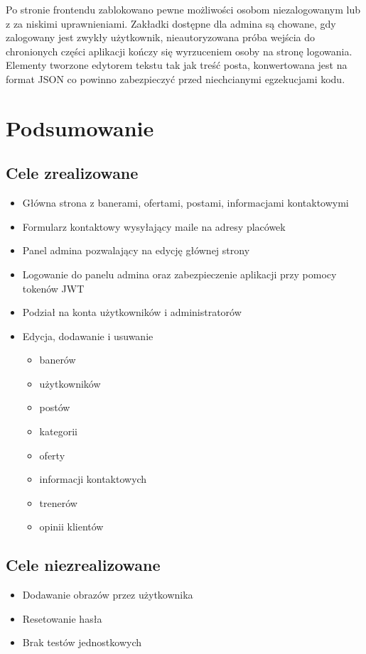 \documentclass[12pt]{article}
\begin{document}
Po stronie frontendu zablokowano pewne możliwości osobom niezalogowanym lub z za niskimi uprawnieniami. Zakładki dostępne dla admina są chowane, gdy zalogowany jest zwykły użytkownik, nieautoryzowana próba wejścia do chronionych części aplikacji kończy się wyrzuceniem osoby na stronę logowania.
\\

Elementy tworzone edytorem tekstu tak jak treść posta, konwertowana jest na format JSON co powinno zabezpieczyć przed niechcianymi egzekucjami kodu.
\section{Podsumowanie}
\subsection{Cele zrealizowane}
\begin{itemize}
\item Główna strona z banerami, ofertami, postami, informacjami kontaktowymi
\item Formularz kontaktowy wysyłający maile na adresy placówek
\item Panel admina pozwalający na edycję głównej strony
\item Logowanie do panelu admina oraz zabezpieczenie aplikacji przy pomocy tokenów JWT
\item Podział na konta użytkowników i administratorów
\item Edycja, dodawanie i usuwanie
\begin{itemize}
\item banerów
\item użytkowników
\item postów
\item kategorii
\item oferty
\item informacji kontaktowych
\item trenerów
\item opinii klientów
\end{itemize}
\end{itemize}
\subsection{Cele niezrealizowane}
\begin{itemize}
\item Dodawanie obrazów przez użytkownika
\item Resetowanie hasła
\item Brak testów jednostkowych
\end{itemize}
\end{document}
